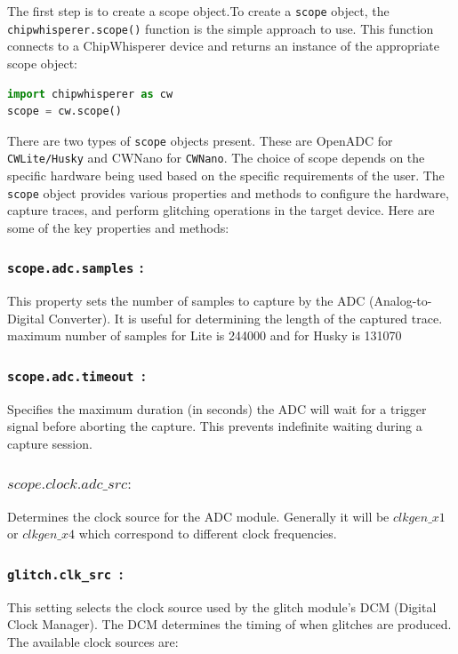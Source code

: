 The first step is to create a scope object.To create a \texttt{scope} object, the \texttt{chipwhisperer.scope()} function is the simple approach to use. This function connects to a ChipWhisperer device and returns an instance of the appropriate scope object:

\begin{lstlisting}[language=Python]
import chipwhisperer as cw
scope = cw.scope()
\end{lstlisting}

There are two types of \texttt{scope} objects present. These are OpenADC for \texttt{CWLite/Husky} and CWNano for \texttt{CWNano}. The choice of scope depends on the specific hardware being used based on the specific requirements of the user.
The \texttt{scope} object provides various properties and methods to configure the hardware, capture traces, and perform glitching operations in the target device. Here are some of the key properties and methods:
\subsubsection{\textbf{\texttt{scope.adc.samples} :}}
This property sets the number of samples to capture by the  ADC (Analog-to-Digital Converter). It is useful for determining the length of the captured trace.
maximum number of samples for Lite is 244000 and for Husky is 131070

\subsubsection{\textbf{\texttt{scope.adc.timeout }:}}
  
Specifies the maximum duration (in seconds) the ADC will wait for a trigger signal before aborting the capture. This prevents indefinite waiting during a capture session.
\subsubsection{$scope.clock.adc\_src :$}

Determines the clock source for the  ADC  module. Generally it will be $clkgen\_x1$ or $clkgen\_x4$ which correspond to different clock frequencies.
\subsubsection{\textbf{\texttt{glitch.clk\_src }:}}

This setting selects the clock source used by the glitch module's DCM (Digital Clock Manager). The DCM determines the timing of when glitches are produced.
The available clock sources are:

